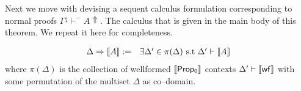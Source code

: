 Next we move with devising a sequent calculus formulation corresponding to normal proofs $\Gamma^{\downarrow}\vdash^{-}A\Uparrow$. The calculus that is given in the main body of this theorem. We repeat it here for completeness.
\begin{mdframed}[nobreak=true,frametitle={\footnotesize Sequent Calculus ($\llbracket {\sf Prop_0} \rrbracket$)}]
	$$\begin{array}{l r}
	\Delta \Rightarrow \llbracket A\rrbracket:= & \exists \Delta'\in \pi(\Delta)\ \text{s.t} \   
	\Delta'\vdash \llbracket A \rrbracket \end{array}$$
	where $\pi(\Delta)$ is the collection of wellformed  $\llbracket {\sf Prop_0} \rrbracket$ contexts $\Delta'\vdash \llbracket {\sf wf}\rrbracket$  with some permutation of the multiset $\Delta$ as co--domain.
\end{mdframed} 


